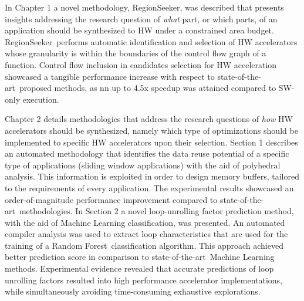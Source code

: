 \documentclass[]{usiinfthesis}
\newcommand{\rseeker}{{RegionSeeker}}
\newcommand{\SoTA}{{state-of-the-art}}
\newcommand{\RF}{{Random Forest}}
\begin{document}
In Chapter 1 a novel methodology, \rseeker, was described that presents insights addressing the research question of {\em what} part, or which parts, of an application should be synthesized to HW under a constrained area budget. \rseeker\ performs automatic identification and selection of HW accelerators whose granularity is within the boundaries 
of the control flow graph of a function.
Control flow inclusion in candidates selection for HW acceleration showcased a tangible performance increase with respect to \SoTA\ 
proposed methods, as nn up to 4.5x speedup was attained compared to SW-only execution.\par

Chapter 2 details methodologies that address the research questions of {\em how} HW
accelerators should be synthesized, namely which type of optimizations should be implemented
to specific HW accelerators upon their selection. Section 1 describes an automated 
methodology that identifies the data reuse potential of a specific type of applications
(sliding window applications) with the aid of polyhedral analysis. This information is 
exploited in order to design memory buffers, tailored to the requirements of every application. The experimental results showcased an order-of-magnitude performance 
improvement compared to \SoTA\ methodologies.
In Section 2 a novel loop-unrolling factor prediction 
method, with the aid of Machine Learning classification, was presented. An automated compiler
analysis was used to extract loop characteristics that are used for the training of a \RF\ classification algorithm. This approach achieved better prediction score 
in comparison to \SoTA\ Machine Learning methods. Experimental evidence revealed that 
accurate predictions of loop unrolling factors resulted into high performance accelerator implementations, while simultaneously avoiding time-consuming exhaustive explorations.\par
\end{document}
